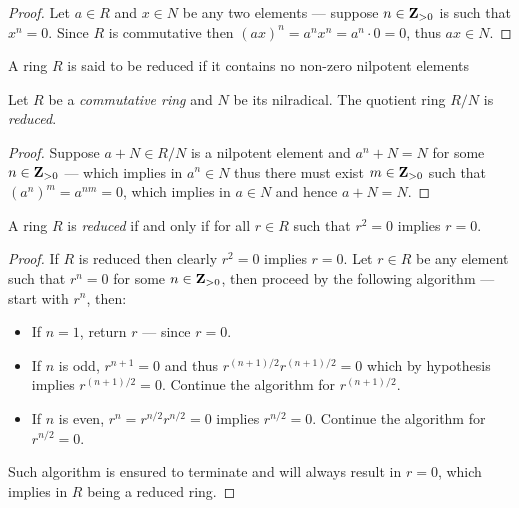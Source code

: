 \begin{proof}
    Let \(a \in R\) and \(x \in N\) be any two elements --- suppose \(n \in
    \mathbf{Z}_{>0}\) is such that \(x^n = 0\). Since \(R\) is commutative then \((a x)^n =
    a^n x^n = a^n \cdot 0 = 0\), thus \(a x \in N\).
\end{proof}

\begin{definition}
    \label{def:reduced-ring}
    A ring \(R\) is said to be reduced if it contains no non-zero nilpotent elements
\end{definition}

\begin{corollary}
    \label{cor:reducing-with-nilradical}
    Let \(R\) be a \emph{commutative ring} and \(N\) be its nilradical. The quotient
    ring \(R/N\) is \emph{reduced}.
\end{corollary}

\begin{proof}
    Suppose \(a + N \in R/N\) is a nilpotent element and \(a^n + N = N\) for some
    \(n \in \mathbf{Z}_{>0}\) --- which implies in \(a^n \in N\) thus there must exist
    \(m \in \mathbf{Z}_{>0}\) such that \((a^n)^m = a^{nm} = 0\), which implies in
    \(a \in N\) and hence \(a + N = N\).
\end{proof}

\begin{lemma}
    \label{lem:reduced-iff-r2=0-implies-r=0}
    A ring \(R\) is \emph{reduced} if and only if for all \(r \in R\) such that
    \(r^2 = 0\) implies \(r = 0\).
\end{lemma}

\begin{proof}
    If \(R\) is reduced then clearly \(r^2 = 0\) implies \(r = 0\). Let \(r \in R\)
    be any element such that \(r^n = 0\) for some \(n \in \mathbf{Z}_{>0}\), then proceed
    by the following algorithm --- start with \(r^n\), then:
    \begin{itemize}\setlength\itemsep{0em}
        \item If \(n = 1\), return \(r\) --- since \(r = 0\).
        \item If \(n\) is odd, \(r^{n + 1} = 0\) and thus
              \(r^{(n+1)/2} r^{(n+1)/2} = 0\) which by hypothesis implies \(r^{(n+1)/2} =
              0\). Continue the algorithm for \(r^{(n+1)/2}\).
        \item If \(n\) is even, \(r^n = r^{n/2} r^{n/2} = 0\) implies \(r^{n/2} =
              0\). Continue the algorithm for \(r^{n/2} = 0\).
    \end{itemize}
    Such algorithm is ensured to terminate and will always result in \(r = 0\),
    which implies in \(R\) being a reduced ring.
\end{proof}

